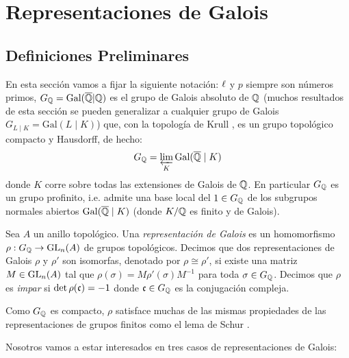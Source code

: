 \documentclass[../../tesis_maestria]{subfiles}
\begin{document}
\section{Representaciones de Galois}\label{sec:rep_galois}

\subsection{Definiciones Preliminares}%

En esta secci\'on vamos a fijar la siguiente notaci\'on: $\ell$ y $p$ siempre son n\'umeros primos, $G_{\mathbb{Q}}=\text{Gal}(\overline{\mathbb{Q}}|\mathbb{Q})$ es el grupo de Galois absoluto de $\mathbb{Q}$ (muchos resultados de esta secci\'on se pueden generalizar a cualquier grupo de Galois $G_{L\mid K}=\text{Gal}(L\mid K)$) que, con la topolog\'ia de Krull \cite[cap\'itulo IV, \S1]{NeukirchANT}, es un grupo topol\'ogico compacto y Hausdorff, de hecho:
\[
  G_{\mathbb{Q}}=\varprojlim_{K}\text{Gal}(\overline{\mathbb{Q}}\mid K)
\]
donde $K$ corre sobre todas las extensiones de Galois de $\mathbb{Q}$. En particular $G_{\mathbb{Q}}$ es un grupo profinito, i.e. admite una base local del $1\in G_{\mathbb{Q}}$ de los subgrupos normales abiertos $\text{Gal}(\overline{\mathbb{Q}}\mid K)$ (donde $K/\mathbb{Q}$ es finito y de Galois).

\begin{defin}
  Sea $A$ un anillo topol\'ogico. Una \emph{representaci\'on de Galois} es un homomorfismo $\rho:G_{\mathbb{Q}}\rightarrow\mathrm{GL}_n(A)$ de grupos topol\'ogicos. Decimos que dos representaciones de Galois $\rho$ y $\rho'$ son isomorfas, denotado por $\rho\cong\rho'$, si existe una matriz $M\in\mathrm{GL}_n(A)$ tal que $\rho(\sigma)=M\rho'(\sigma)M^{-1}$ para toda $\sigma\in G_{\mathbb{Q}}$. Decimos que $\rho$ es \emph{impar} si $\det\rho(\mathfrak{c})=-1$ donde $\mathfrak{c}\in G_{\mathbb{Q}}$ es la conjugaci\'on compleja.
\end{defin}

\begin{nota}
  Como $G_{\mathbb{Q}}$ es compacto, $\rho$ satisface muchas de las mismas propiedades de las representaciones de grupos finitos como el lema de Schur \cite[parte I, \S4]{SerreLROFG}.
\end{nota}

Nosotros vamos a estar interesados en tres casos de representaciones de Galois:
\end{document}
